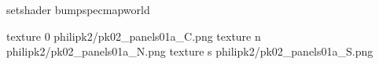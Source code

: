 setshader bumpspecmapworld

texture 0 philipk2/pk02_panels01a_C.png
texture n philipk2/pk02_panels01a_N.png
texture s philipk2/pk02_panels01a_S.png

